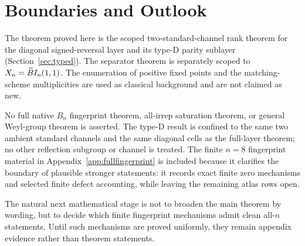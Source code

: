 \section{Boundaries and Outlook}\label{sec:boundaries}

The theorem proved here is the scoped two-standard-channel rank theorem for the diagonal signed-reversal layer and its type-D parity sublayer (Section~\ref{sec:typed}).  The separator theorem is separately scoped to $X_n=\widetilde{B}I_n(1,1)$.  The enumeration of positive fixed points and the matching-scheme multiplicities are used as classical background and are not claimed as new.

No full native $B_n$ fingerprint theorem, all-irrep saturation theorem, or general Weyl-group theorem is asserted.  The type-D result is confined to the same two ambient standard channels and the same diagonal cells as the full-layer theorem; no other reflection subgroup or channel is treated.  The finite $n=8$ fingerprint material in Appendix~\ref{app:fullfingerprint} is included because it clarifies the boundary of plausible stronger statements: it records exact finite zero mechanisms and selected finite defect accounting, while leaving the remaining atlas rows open.

The natural next mathematical stage is not to broaden the main theorem by wording, but to decide which finite fingerprint mechanisms admit clean all-$n$ statements.  Until such mechanisms are proved uniformly, they remain appendix evidence rather than theorem statements.
